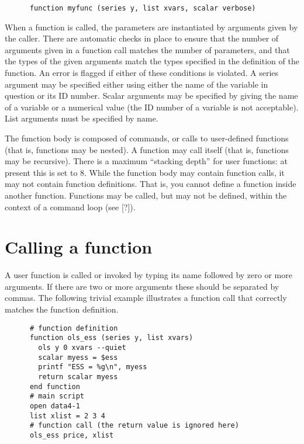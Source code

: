 \begin{verbatim}
      function myfunc (series y, list xvars, scalar verbose)\end{verbatim}

      When a function is called, the parameters are instantiated by arguments
      given by the caller.  There are automatic checks in place to ensure that
      the number of arguments given in a function call matches the number of
      parameters, and that the types of the given arguments match the types
      specified in the definition of the function.  An error is flagged if
      either of these conditions is violated.  A series argument may be
      specified either using either the name of the variable in question or its
      ID number.  Scalar arguments may be specified by giving the name of a
      variable or a numerical value (the ID number of a variable is not
      acceptable).  List arguments must be specified by name.  
    
      The function body is composed of
       commands, or calls to user-defined
      functions (that is, functions may be nested).  A function may call itself
      (that is, functions may be recursive). There is a maximum ``stacking
	depth'' for user functions: at present this is set to 8.  While
      the function body may contain function calls, it may not contain function
      definitions.  That is, you cannot define a function inside another
      function.
      Functions may be called, but may not be defined, within the context of a
      command loop (see [?]).
    

\section{Calling a function}
\label{func-call}

A user function is called or invoked by typing its name followed by
      zero or more arguments.  If there are two or more arguments these should
      be separated by commas.  The following trivial example illustrates a
      function call that correctly matches the function definition.
    
\begin{verbatim}
      # function definition
      function ols_ess (series y, list xvars)
        ols y 0 xvars --quiet
        scalar myess = $ess
        printf "ESS = %g\n", myess
        return scalar myess
      end function
      # main script
      open data4-1
      list xlist = 2 3 4
      # function call (the return value is ignored here)
      ols_ess price, xlist\end{verbatim}

